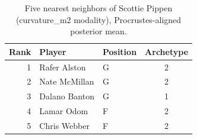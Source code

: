 \begin{table}[htbp]
  \centering\small
  \begin{tabular}{rllc}
    \toprule
    Rank & Player & Position & Archetype \\
    \midrule
    1 & Rafer Alston & G & 2 \\
    2 & Nate McMillan & G & 2 \\
    3 & Dalano Banton & G & 1 \\
    4 & Lamar Odom & F & 2 \\
    5 & Chris Webber & F & 2 \\
    \bottomrule
  \end{tabular}
  \caption{Five nearest neighbors of Scottie Pippen (curvature_m2 modality), Procrustes-aligned posterior mean.}
  \label{tab:Scottie_Pippen_neighbors_curvature_m2}
\end{table}

